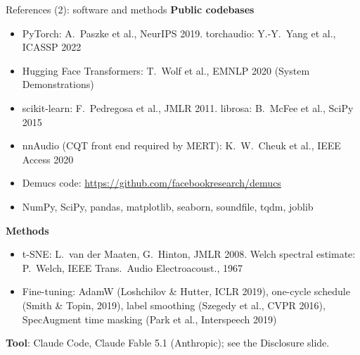 \documentclass[aspectratio=169,11pt]{beamer}
\newenvironment{tight}{\begin{itemize}\setlength{\itemsep}{1.5pt}\setlength{\parskip}{0pt}\setlength{\topsep}{0pt}}{\end{itemize}}
\begin{document}
\begin{frame}[t]{References (2): software and methods}
  \footnotesize
  \textbf{Public codebases}
  \begin{tight}\footnotesize
    \item PyTorch: A.~Paszke et al., NeurIPS 2019. \quad torchaudio: Y.-Y.~Yang et al., ICASSP 2022
    \item Hugging Face Transformers: T.~Wolf et al., EMNLP 2020 (System Demonstrations)
    \item scikit-learn: F.~Pedregosa et al., JMLR 2011. \quad librosa: B.~McFee et al., SciPy 2015
    \item nnAudio (CQT front end required by MERT): K.~W.~Cheuk et al., IEEE Access 2020
    \item Demucs code: \url{https://github.com/facebookresearch/demucs}
    \item NumPy, SciPy, pandas, matplotlib, seaborn, soundfile, tqdm, joblib
  \end{tight}
  \vspace{0.5em}
  \textbf{Methods}
  \begin{tight}\footnotesize
    \item t-SNE: L.~van der Maaten, G.~Hinton, JMLR 2008. \quad Welch spectral estimate: P.~Welch, IEEE Trans.\ Audio Electroacoust., 1967
    \item Fine-tuning: AdamW (Loshchilov \& Hutter, ICLR 2019), one-cycle schedule (Smith \& Topin, 2019), label smoothing (Szegedy et al., CVPR 2016), SpecAugment time masking (Park et al., Interspeech 2019)
  \end{tight}
  \vspace{0.5em}
  \textbf{Tool}: Claude Code, Claude Fable 5.1 (Anthropic); see the Disclosure slide.
\end{frame}
\end{document}
